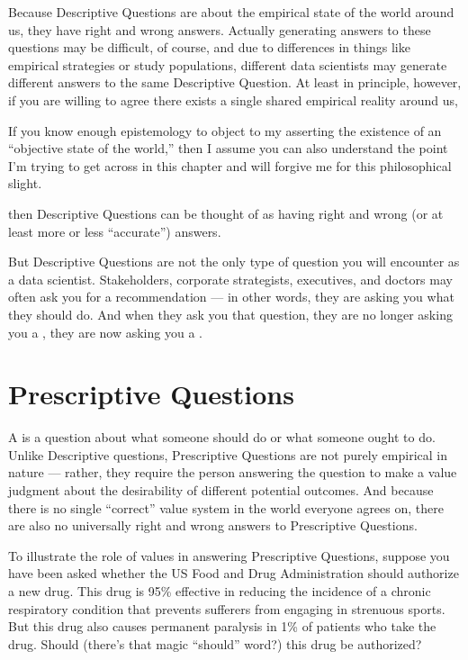 \documentclass[letterpaper,10pt,english]{jupyterBook}
\begin{document}
\sphinxAtStartPar
Because Descriptive Questions are about the empirical state of the world around us, they have right and wrong answers. Actually generating answers to these questions may be difficult, of course, and due to differences in things like empirical strategies or study populations, different data scientists may generate different answers to the same Descriptive Question. At least in principle, however, if you are willing to agree there exists a single shared empirical reality around us,%
\begin{footnote}[1]\sphinxAtStartFootnote
If you know enough epistemology to object to my asserting the existence of an “objective state of the world,” then I assume you can also understand the point I’m trying to get across in this chapter and will forgive me for this philosophical slight.
%
\end{footnote} then Descriptive Questions can be thought of as having right and wrong (or at least more or less “accurate”) answers.

\sphinxAtStartPar
But Descriptive Questions are not the only type of question you will encounter as a data scientist. Stakeholders, corporate strategists, executives, and doctors may often ask you for a recommendation — in other words, they are asking you what they should do. And when they ask you that question, they are no longer asking you a , they are now asking you a .


\section{Prescriptive Questions}
\label{\detokenize{30_questions/05_descriptive_v_prescriptive:prescriptive-questions}}
\sphinxAtStartPar
A  is a question about what someone should do or what someone ought to do. Unlike Descriptive questions, Prescriptive Questions are not purely empirical in nature — rather, they require the person answering the question to make a value judgment about the desirability of different potential outcomes. And because there is no single “correct” value system in the world everyone agrees on, there are also no universally right and wrong answers to Prescriptive Questions.

\sphinxAtStartPar
To illustrate the role of values in answering Prescriptive Questions, suppose you have been asked whether the US Food and Drug Administration should authorize a new drug. This drug is 95\% effective in reducing the incidence of a chronic respiratory condition that prevents sufferers from engaging in strenuous sports. But this drug also causes permanent paralysis in 1\% of patients who take the drug. Should (there’s that magic “should” word?) this drug be authorized?
\end{document}

